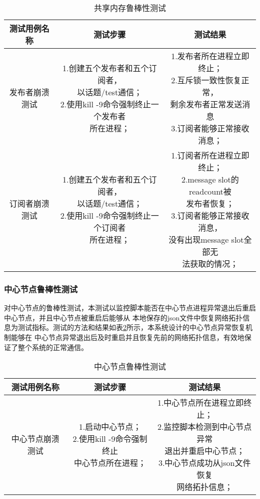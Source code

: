\begin{table}[H]
  \centering\small
  \caption{共享内存鲁棒性测试}
  \renewcommand\arraystretch{1.2}
  \label{shared_memory_robust}
  \begin{tabular}{ccc}
    \toprule
    测试用例名称 & 测试步骤 & 测试结果 \\
    \midrule
    发布者崩溃测试 & \makecell[l]{1.创建五个发布者和五个订阅者，\\以话题/test通信；\\2.使用kill -9命令强制终止一个发布者\\所在进程；} & \makecell[l]{1.发布者所在进程立即终止；\\2.互斥锁一致性恢复正常，\\剩余发布者正常发送消息\\3.订阅者能够正常接收消息；}\\
    \hline
    订阅者崩溃测试 & \makecell[l]{1.创建五个发布者和五个订阅者，\\以话题/test通信；\\2.使用kill -9命令强制终止一个订阅者\\所在进程；} & \makecell[l]{1.订阅者所在进程立即终止；\\2.message slot的readcount被\\发布者恢复；\\3.订阅者能够正常接收消息，\\没有出现message slot全部无\\法获取的情况；} \\
    \bottomrule
  \end{tabular}
\end{table}

\subsubsection{中心节点鲁棒性测试}
对中心节点的鲁棒性测试，本测试以监控脚本能否在中心节点进程异常退出后重启中心节点，并且中心节点被重启后能够从
本地保存的json文件中恢复网络拓扑信息为测试指标。测试的方法和结果如表\ref{master_robust}所示，本系统设计的中心节点异常恢复机制能够在
中心节点异常退出后及时重启并且恢复先前的网络拓扑信息，有效地保证了整个系统的正常通信。

\begin{table}[H]
  \centering\small
  \caption{中心节点鲁棒性测试}
  \renewcommand\arraystretch{1.2}
  \label{master_robust}
  \begin{tabular}{ccc}
    \toprule
    测试用例名称 & 测试步骤 & 测试结果 \\
    \midrule
    中心节点崩溃测试 & \makecell[l]{1.启动中心节点；\\2.使用kill -9命令强制终止\\中心节点所在进程；} & \makecell[l]{1.中心节点所在进程立即终止；\\2.监控脚本检测到中心节点异常\\退出并重启中心节点；\\3.中心节点成功从json文件恢复\\网络拓扑信息；}\\
    \bottomrule
  \end{tabular}
\end{table}

